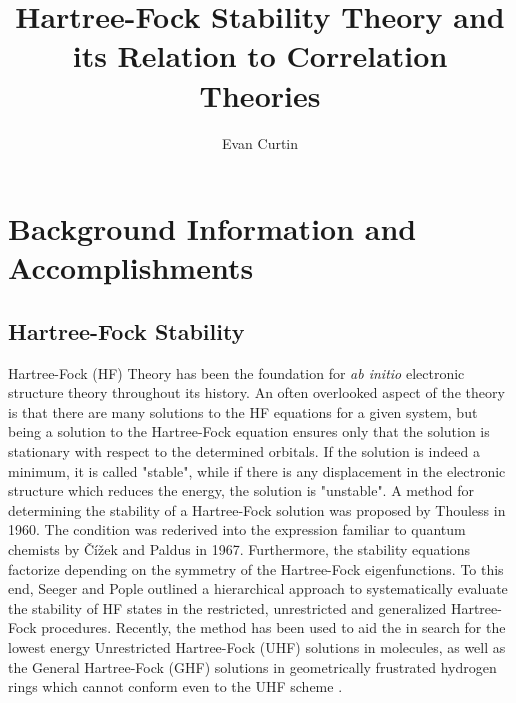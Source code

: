 \documentclass{revtex4}
\begin{document}
\title{Hartree-Fock Stability Theory and its Relation to Correlation Theories}
\author{Evan Curtin}
\maketitle


\section{Background Information and Accomplishments}

   
   \subsection{Hartree-Fock Stability}
    Hartree-Fock (HF) Theory has been the foundation for \emph{ab initio} electronic structure 
    theory 
    throughout its history. An often overlooked aspect of the theory is that there are many 
    solutions to the HF equations for a given system, but being a 
    solution to the Hartree-Fock equation ensures only that the solution is stationary with respect 
    to the 
    determined orbitals. If the solution is indeed a minimum, it is called "stable", while if there 
    is any displacement in the electronic structure which reduces the energy, the solution is 
    "unstable". A method for determining the stability of a Hartree-Fock solution was 
    proposed by Thouless in 1960\cite{Thouless1960}. The condition was rederived into the 
    expression familiar to quantum chemists by Čížek and Paldus in 1967\cite{Cizek1967}. 
    Furthermore, the stability equations factorize depending on the symmetry of the Hartree-Fock 
    eigenfunctions. To this end, Seeger and Pople outlined a hierarchical approach to 
    systematically evaluate the stability of HF states in the restricted, unrestricted and 
    generalized Hartree-Fock procedures\cite{Seeger1977}. Recently, the method has been used to aid 
    the in search for the lowest energy Unrestricted Hartree-Fock (UHF) solutions in molecules, as 
    well as the General Hartree-Fock (GHF) solutions in geometrically frustrated hydrogen rings 
    which cannot conform even to the UHF scheme \cite{Pulay2016}\cite{Goings2015}.
    
\end{document}
